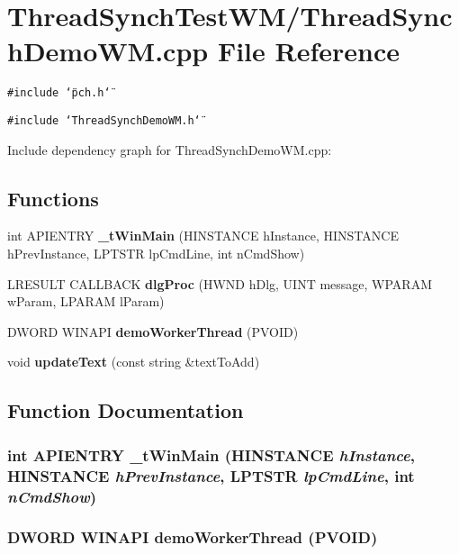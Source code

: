 \section{Thread\-Synch\-Test\-WM/Thread\-Synch\-Demo\-WM.cpp File Reference}
\label{_thread_synch_demo_w_m_8cpp}
{\tt \#include \char`\"{}pch.h\char`\"{}}\par
{\tt \#include \char`\"{}Thread\-Synch\-Demo\-WM.h\char`\"{}}\par


Include dependency graph for Thread\-Synch\-Demo\-WM.cpp:\subsection*{Functions}
\begin{CompactItemize}
\item 
int APIENTRY {\bf \_\-t\-Win\-Main} (HINSTANCE h\-Instance, HINSTANCE h\-Prev\-Instance, LPTSTR lp\-Cmd\-Line, int n\-Cmd\-Show)
\item 
LRESULT CALLBACK {\bf dlg\-Proc} (HWND h\-Dlg, UINT message, WPARAM w\-Param, LPARAM l\-Param)
\item 
DWORD WINAPI {\bf demo\-Worker\-Thread} (PVOID)
\item 
void {\bf update\-Text} (const string \&text\-To\-Add)
\end{CompactItemize}


\subsection{Function Documentation}
\subsubsection{\setlength{\rightskip}{0pt plus 5cm}int APIENTRY \_\-t\-Win\-Main (HINSTANCE {\em h\-Instance}, HINSTANCE {\em h\-Prev\-Instance}, LPTSTR {\em lp\-Cmd\-Line}, int {\em n\-Cmd\-Show})}\label{_thread_synch_demo_w_m_8cpp_af5e7f94cc186f55d373ad6a6d311bcb}


\subsubsection{\setlength{\rightskip}{0pt plus 5cm}DWORD WINAPI demo\-Worker\-Thread (PVOID)}\label{_thread_synch_demo_w_m_8cpp_cdde2e96e924a55bbb9f944121f04104}


